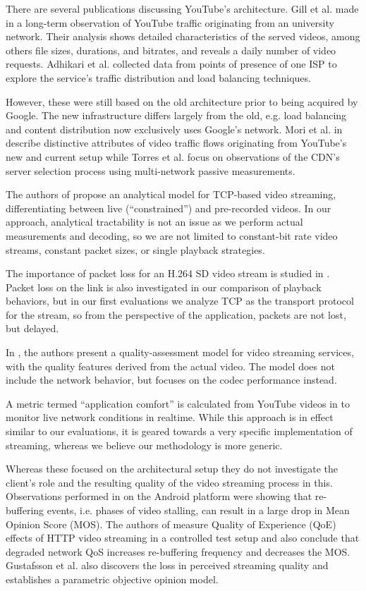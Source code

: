 There are several publications discussing YouTube's architecture. Gill et al. made in \cite{gill2007youtube} a long-term observation of YouTube traffic originating from an university network. Their analysis shows detailed characteristics of the served videos, among others file sizes, durations, and bitrates, and reveals a daily number of video requests. Adhikari et al. \cite{adhikari2010youtube} collected data from points of presence of one ISP to explore the service's traffic distribution and load balancing techniques.

However, these were still based on the old architecture prior to being acquired by Google. The new infrastructure differs largely from the old, e.g. load balancing and content distribution now exclusively uses Google’s network. Mori et al. in \cite{mori2010characterizing} describe distinctive attributes of video traffic flows originating from YouTube's new and current setup while Torres et al. \cite{torres2011dissecting} focus on observations of the CDN's server selection process using multi-network passive measurements.


The authors of \cite{wang2003model} propose an analytical model for TCP-based video streaming, differentiating between live (``constrained'') and pre-recorded videos. In our approach, analytical tractability is not an issue as we perform actual measurements and decoding, so we are not limited to constant-bit rate video streams, constant packet sizes, or single playback strategies.

The importance of packet loss for an H.264 SD video stream is studied in \cite{pv2010loss}. Packet loss on the link is also investigated in our comparison of playback behaviors, but in our first evaluations we analyze TCP as the transport protocol for the stream, so from the perspective of the application, packets are not lost, but delayed.


In \cite{pv2010qoe}, the authors present a quality-assessment model for video streaming services, with the quality features derived from the actual video. The model does not include the network behavior, but focuses on the codec performance instead. 

A metric termed ``application comfort'' is calculated from YouTube videos in \cite{staehle2010yomo} to monitor live network conditions in realtime. While this approach is in effect similar to our evaluations, it is geared towards a very specific implementation of streaming, whereas we believe our methodology is more generic.

Whereas these focused on the architectural setup they do not investigate the client's role and the resulting quality of the video streaming process in this. 
Observations performed in \cite{ketyko2010qoe} on the Android platform were showing that re-buffering events, i.e. phases of video stalling, can result in a large drop in Mean Opinion Score (MOS). The authors of \cite{mokmeasuring} measure Quality of Experience (QoE) effects of HTTP video streaming in a controlled test setup and also conclude that degraded network QoS increases re-buffering frequency and decreases the MOS. Gustafsson et al. \cite{gustafsson2008measuring} also discovers the loss in perceived streaming quality and establishes a parametric objective opinion model.
